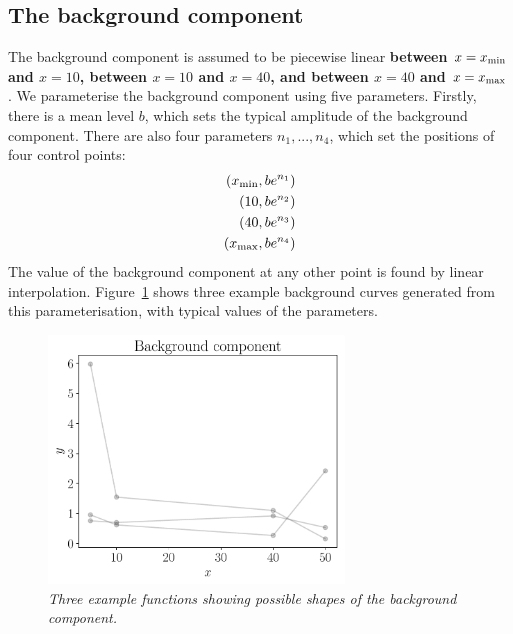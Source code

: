 \documentclass[a4paper, 12pt]{elsarticle}
\newcommand{\x}{x}
\newcommand{\todo}{\color{orange} \bf}
\begin{document}
\subsection{The background component}
The background component is assumed to be piecewise linear
{\todo between $\x=\x_{\rm min}$ and $\x=10$, between $\x=10$ and $\x=40$,
and between $\x=40$ and $\x=\x_{\rm max}$}.
We parameterise the background component using
five parameters. Firstly, there is a mean level $b$, which sets the
typical amplitude of the background component. There are also four parameters
$n_1, ..., n_4$, which set the positions of four control points:
\begin{align}
\left(\x_{\rm min}, be^{n_1}\right) \nonumber\\
\left(10, be^{n_2}\right) \nonumber\\
\left(40, be^{n_3}\right) \nonumber\\
\left(\x_{\rm max}, be^{n_4}\right) \nonumber
\end{align}
The value of the background component at any other point is found by
linear interpolation. Figure~\ref{fig:background} shows three example
background curves generated from this parameterisation, with typical
values of the parameters.

\begin{figure}
\centering
\includegraphics[width=0.7\textwidth]{figures/background.pdf}
\caption{\it Three example functions showing possible shapes of the
background component.\label{fig:background}}
\end{figure}
\end{document}

